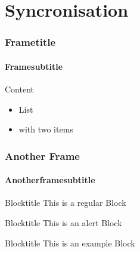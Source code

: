 \section{Syncronisation}
\begin{frame}
    \frametitle{Frametitle}
    \framesubtitle{Framesubtitle}
    Content
    \begin{itemize}
        \item List
        \item with two items
    \end{itemize}
\end{frame}
\begin{frame}
    \frametitle{Another Frame}
    \framesubtitle{Anotherframesubtitle}
    \begin{block}{Blocktitle}
        This is a regular Block
    \end{block}
    \begin{alertblock}{Blocktitle}
        This is an alert Block
    \end{alertblock}
    \begin{exampleblock}{Blocktitle}
        This is an example Block
    \end{exampleblock}
\end{frame}
